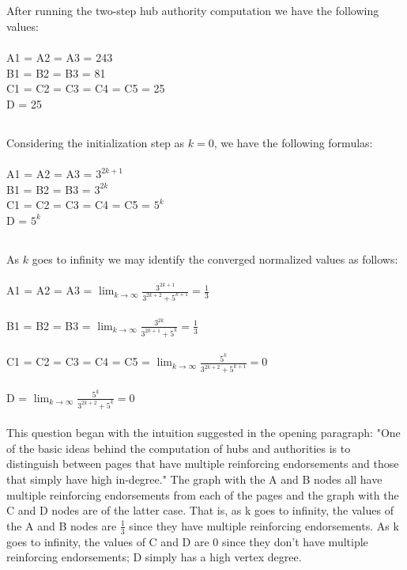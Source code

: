 \documentclass[12pt]{article}
\begin{document}
\subsection{}
After running the two-step hub authority computation we have the following values:
\\ \\
A1 = A2 = A3 = 243 \\
B1 = B2 = B3 = 81 \\
C1 = C2 = C3 = C4 = C5 = 25 \\
D = 25
\subsection{}
Considering the initialization step as $k = 0$, we have the following formulas: 
\\ \\
A1 = A2 = A3 = $3^{2k+1}$ \\
B1 = B2 = B3 = $3^{2k}$ \\
C1 = C2 = C3 = C4 = C5 = $5^k$ \\
D = $5^k$
\subsection{}
As $k$ goes to infinity we may identify the converged normalized values as follows:
\\
\\
A1 = A2 = A3 = $\lim_{k\to\infty} \frac{3^{2k+1}}{3^{2k+2}+5^{k+1}} = \frac{1}{3}$
\\
\\
B1 = B2 = B3 = $\lim_{k\to\infty} \frac{3^{2k}}{3^{2k+1}+5^{k}} = \frac{1}{3}$
\\
\\
C1 = C2 = C3 = C4 = C5 = $\lim_{k\to\infty} \frac{5^k}{3^{2k+2}+5^{k+1}} = 0$
\\
\\
D = $\lim_{k\to\infty} \frac{5^k}{3^{2k+2}+5^{k}} = 0$
\\ 
\\
This question began with the intuition suggested in the opening paragraph: "One of the basic ideas behind the computation of hubs and authorities is to distinguish between pages that have multiple reinforcing endorsements and those that simply have high in-degree." The graph with the A and B nodes all have multiple reinforcing endorsements from each of the pages and the graph with the C and D nodes are of the latter case. That is, as k goes to infinity, the values of the A and B nodes are $\frac{1}{3}$ since they have multiple reinforcing endorsements. As k goes to infinity, the values of C and D are 0 since they don't have multiple reinforcing endorsements; D simply has a high vertex degree. 
\end{document}
